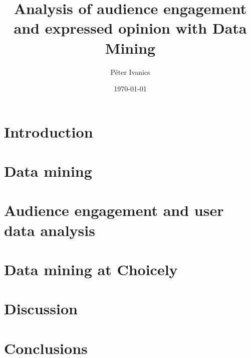 \documentclass[english]{tktltiki}
\begin{document}
\onehalfspacing

\title{Analysis of audience engagement and expressed opinion with Data Mining}
\author{P\'eter Ivanics}

\date{\today}

\maketitle


\begin{abstract}
\end{abstract}

\mytableofcontents

	\section{Introduction}
	
	
	\section{Data mining}

	\section{Audience engagement and user data analysis}
		
	
	\section{Data mining at Choicely}
	
	
	\section{Discussion}
	

	\section{Conclusions}
	    

\pagebreak   
\nocite{*}



\lastpage
\appendices
\pagestyle{empty}

%
%
\end{document}
